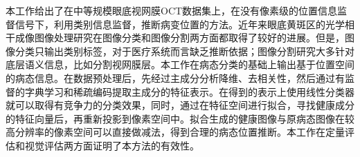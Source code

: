 
\begin{cabstract}
   本工作给出了在中等规模眼底视网膜OCT数据集上，在没有像素级的位置信息监督信号下，利用类别信息监督，推断病变位置的方法。近年来眼底黄斑区的光学相干成像图像处理研究在图像分类和图像分割两方面都取得了较好的进展。但是，图像分类只输出类别标签，对于医疗系统而言缺乏推断依据；图像分割研究大多针对底层语义信息，比如分割视网膜层。本工作在病态分类的基础上输出基于位置空间的病态信息。在数据预处理后，先经过主成分分析降维、去相关性，然后通过有监督的字典学习和稀疏编码提取主成分的特征表示。在得到的表示上使用线性分类器就可以取得有竞争力的分类效果，同时，通过在特征空间进行拟合，寻找健康成分的特征向量后，再重新投影到像素空间中。拟合生成的健康图像与原病态图像在较高分辨率的像素空间可以直接做减法，得到合理的病态位置推断。本工作在定量评估和视觉评估两方面证明了本方法的有效性。

\end{cabstract}

